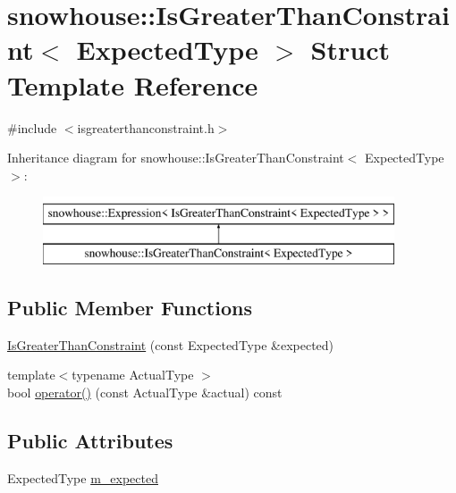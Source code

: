 \hypertarget{structsnowhouse_1_1IsGreaterThanConstraint}{}\section{snowhouse\+::Is\+Greater\+Than\+Constraint$<$ Expected\+Type $>$ Struct Template Reference}
\label{structsnowhouse_1_1IsGreaterThanConstraint}


{\ttfamily \#include $<$isgreaterthanconstraint.\+h$>$}

Inheritance diagram for snowhouse\+::Is\+Greater\+Than\+Constraint$<$ Expected\+Type $>$\+:\begin{figure}[H]
\begin{center}
\leavevmode
\includegraphics[height=2.000000cm]{structsnowhouse_1_1IsGreaterThanConstraint}
\end{center}
\end{figure}
\subsection*{Public Member Functions}
\begin{DoxyCompactItemize}
\item 
\mbox{\hyperlink{structsnowhouse_1_1IsGreaterThanConstraint_a2d49781d1f61ffb68e8d62c6680943ae}{Is\+Greater\+Than\+Constraint}} (const Expected\+Type \&expected)
\item 
{\footnotesize template$<$typename Actual\+Type $>$ }\\bool \mbox{\hyperlink{structsnowhouse_1_1IsGreaterThanConstraint_a4c000324f73e0f665305e3ec41e5da5c}{operator()}} (const Actual\+Type \&actual) const
\end{DoxyCompactItemize}
\subsection*{Public Attributes}
\begin{DoxyCompactItemize}
\item 
Expected\+Type \mbox{\hyperlink{structsnowhouse_1_1IsGreaterThanConstraint_ac32fe63955ecec445be321f99896a28a}{m\+\_\+expected}}
\end{DoxyCompactItemize}


